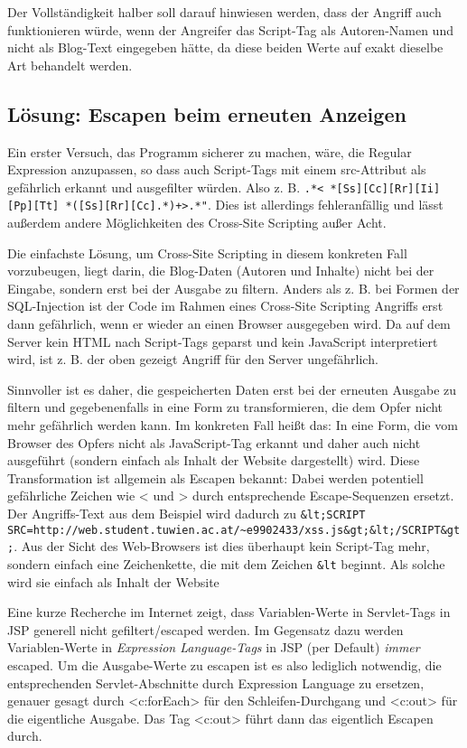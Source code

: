 Der Vollständigkeit halber soll darauf hinwiesen werden, dass der Angriff auch funktionieren würde, wenn der Angreifer das Script-Tag als Autoren-Namen und nicht als Blog-Text eingegeben hätte, da diese beiden Werte auf exakt dieselbe Art behandelt werden.

\subsection{Lösung: Escapen beim erneuten Anzeigen}

Ein erster Versuch, das Programm sicherer zu machen, wäre, die Regular Expression anzupassen, so dass auch Script-Tags mit einem src-Attribut als gefährlich erkannt und ausgefilter würden. Also z. B. \lstinline$.*< *[Ss][Cc][Rr][Ii][Pp][Tt] *([Ss][Rr][Cc].*)+>.*"$. Dies ist allerdings fehleranfällig und lässt außerdem andere Möglichkeiten des Cross-Site Scripting außer Acht.

Die einfachste Lösung, um Cross-Site Scripting in diesem konkreten Fall vorzubeugen, liegt darin, die Blog-Daten (Autoren und Inhalte) nicht bei der Eingabe, sondern erst bei der Ausgabe zu filtern. Anders als z. B. bei Formen der SQL-Injection ist der Code im Rahmen eines Cross-Site Scripting Angriffs erst dann gefährlich, wenn er wieder an einen Browser ausgegeben wird. Da auf dem Server kein HTML nach Script-Tags geparst und kein JavaScript interpretiert wird, ist z. B. der oben gezeigt Angriff für den Server ungefährlich.

Sinnvoller ist es daher, die gespeicherten Daten erst bei der erneuten Ausgabe zu filtern und gegebenenfalls in eine Form zu transformieren, die dem Opfer nicht mehr gefährlich werden kann. Im konkreten Fall heißt das: In eine Form, die vom Browser des Opfers nicht als JavaScript-Tag erkannt und daher auch nicht ausgeführt (sondern einfach als Inhalt der Website dargestellt) wird. Diese Transformation ist allgemein als Escapen bekannt: Dabei werden potentiell gefährliche Zeichen wie < und > durch entsprechende Escape-Sequenzen ersetzt. Der Angriffs-Text aus dem Beispiel wird dadurch zu \lstinline$&lt;SCRIPT SRC=http://web.student.tuwien.ac.at/~e9902433/xss.js&gt;&lt;/SCRIPT&gt;$. Aus der Sicht des Web-Browsers ist dies überhaupt kein Script-Tag mehr, sondern einfach eine Zeichenkette, die mit dem Zeichen \lstinline$&lt$ beginnt. Als solche wird sie einfach als Inhalt der Website 

Eine kurze Recherche im Internet zeigt, dass Variablen-Werte in Servlet-Tags in JSP generell nicht gefiltert/escaped werden. Im Gegensatz dazu werden Variablen-Werte in \emph{Expression Language-Tags} in JSP (per Default) \emph{immer} escaped. Um die Ausgabe-Werte zu escapen ist es also lediglich notwendig, die entsprechenden Servlet-Abschnitte durch Expression Language zu ersetzen, genauer gesagt durch <c:forEach> für den Schleifen-Durchgang und <c:out> für die eigentliche Ausgabe. Das Tag <c:out> führt dann das eigentlich Escapen durch.

